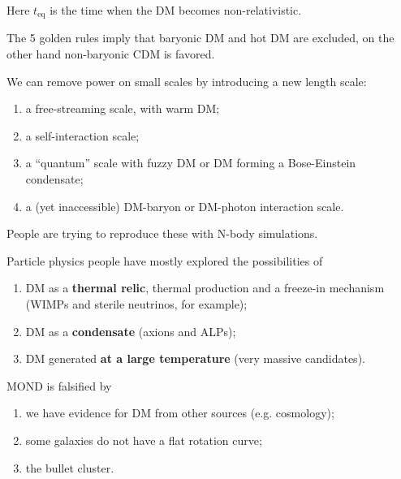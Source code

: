 \documentclass[main.tex]{subfiles}
\begin{document}
Here \(t _{\text{eq}}\) is the time when the DM becomes non-relativistic. 


The 5 golden rules imply that baryonic DM and hot DM are excluded, 
on the other hand non-baryonic CDM is favored. 

We can remove power on small scales by introducing a new length scale: 
\begin{enumerate}
    \item a free-streaming scale, with warm DM;
    \item a self-interaction scale;
    \item a ``quantum'' scale with fuzzy DM or DM forming a Bose-Einstein condensate;
    \item a (yet inaccessible) DM-baryon or DM-photon interaction scale.
\end{enumerate}

People are trying to reproduce these with N-body simulations. 

Particle physics people have mostly explored the possibilities of 
\begin{enumerate}
    \item DM as a \textbf{thermal relic}, thermal production and a freeze-in mechanism (WIMPs and sterile neutrinos, for example);
    \item DM as a \textbf{condensate} (axions and ALPs);
    \item DM generated \textbf{at a large temperature} (very massive candidates).
\end{enumerate}

MOND is falsified by 
\begin{enumerate}
    \item we have evidence for DM from other sources (e.g. cosmology);
    \item some galaxies do not have a flat rotation curve;
    \item the bullet cluster. 
\end{enumerate}
\end{document}

